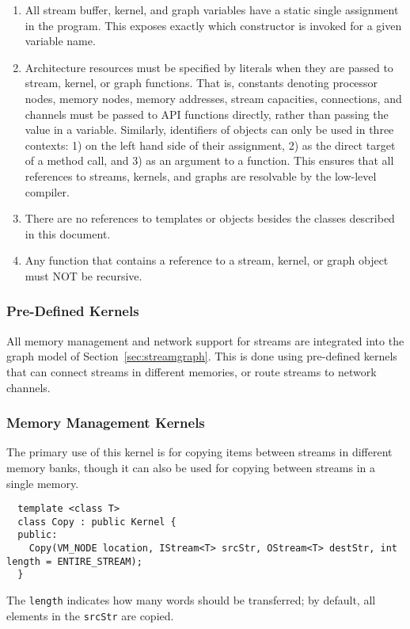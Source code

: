 \begin{enumerate}

\item All stream buffer, kernel, and graph variables have a static
single assignment in the program.  This exposes exactly which
constructor is invoked for a given variable name.

\item Architecture resources must be specified by literals when they
are passed to stream, kernel, or graph functions.  That is, constants
denoting processor nodes, memory nodes, memory addresses, stream
capacities, connections, and channels must be passed to API functions
directly, rather than passing the value in a variable.  Similarly,
identifiers of objects can only be used in three contexts: 1) on the
left hand side of their assignment, 2) as the direct target of a
method call, and 3) as an argument to a function.  This ensures that
all references to streams, kernels, and graphs are resolvable by the
low-level compiler.

\item There are no references to templates or objects besides the
classes described in this document.

\item Any function that contains a reference to a stream, kernel, or
graph object must NOT be recursive.

\end{enumerate}

\subsubsection{Pre-Defined Kernels}
\label{sec:predef}

All memory management and network support for streams are integrated
into the graph model of Section~\ref{sec:streamgraph}.  This is done
using pre-defined kernels that can connect streams in different
memories, or route streams to network channels.

\subsubsection*{Memory Management Kernels}

 The primary use of this kernel is for copying items
between streams in different memory banks, though it can also be used
for copying between streams in a single memory.
{\small
\begin{verbatim}
  template <class T>
  class Copy : public Kernel {
  public:
    Copy(VM_NODE location, IStream<T> srcStr, OStream<T> destStr, int length = ENTIRE_STREAM);
  }
\end{verbatim}}
The {\tt length} indicates how many words should be transferred; by
default, all elements in the {\tt srcStr} are copied.

